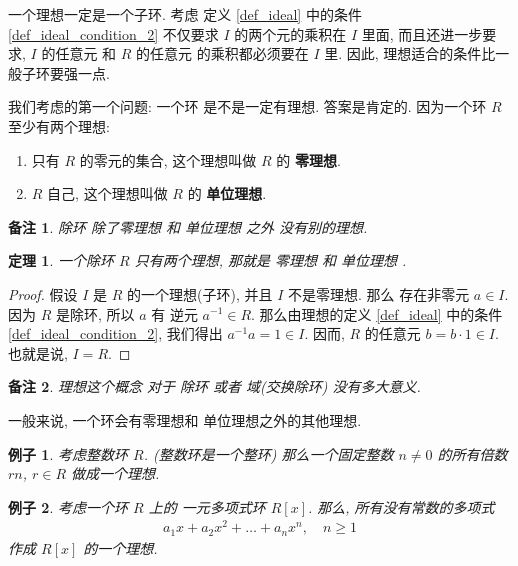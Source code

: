 \documentclass[utf8]{ctexbook}
\newtheorem{theorem}{定理}[section]
\newtheorem{memo}{备注}[section]
\newtheorem{example}{例子}[section]
\begin{document}
一个理想一定是一个子环. 考虑 定义 \ref{def_ideal} 中的条件 \ref{def_ideal_condition_2} 不仅要求 $I$ 的两个元的乘积在 $I$ 里面, 而且还进一步要求, $I$ 的任意元 和 $R$ 的任意元 的乘积都必须要在 $I$ 里. 因此, 理想适合的条件比一般子环要强一点.

我们考虑的第一个问题: 一个环 是不是一定有理想. 答案是肯定的. 因为一个环 $R$ 至少有两个理想:
\begin{enumerate}
\item{只有 $R$ 的零元的集合, 这个理想叫做 $R$ 的 \textbf{零理想}.}
\item{$R$ 自己, 这个理想叫做 $R$ 的 \textbf{单位理想}.}
\end{enumerate}

\begin{memo}
除环 除了零理想 和 单位理想 之外 没有别的理想.
\end{memo}

\begin{theorem}
一个除环 $R$ 只有两个理想, 那就是 零理想 和 单位理想 .
\end{theorem}

\begin{proof}
假设 $I$ 是 $R$ 的一个理想(子环), 并且 $I$ 不是零理想. 那么 存在非零元 $a \in I$. 因为 $R$ 是除环, 所以 $a$ 有 逆元 $a^{-1} \in R $. 那么由理想的定义 \ref{def_ideal} 中的条件 \ref{def_ideal_condition_2}, 我们得出  $a^{-1} a = 1 \in I $. 因而, $R$ 的任意元  $b= b \cdot 1 \in I$. 也就是说, $I=R$.
\end{proof}

\begin{memo}
理想这个概念 对于 除环 或者 域(交换除环) 没有多大意义. 
\end{memo}

一般来说, 一个环会有零理想和 单位理想之外的其他理想.

\begin{example}\label{example_principle_ideal_generated_by_n}
考虑整数环 $R$. (整数环是一个整环) 那么一个固定整数 $n \neq 0 $ 的所有倍数 $rn$, $r \in R$ 做成一个理想.
\end{example}

\begin{example}
考虑一个环 $R$ 上的 一元多项式环 $R[x]$. 那么, 所有没有常数的多项式
\begin{align*}
a_1 x + a_2 x^2 + \ldots + a_n x^n, \quad n \geq 1
\end{align*}
作成 $R[x]$ 的一个理想.
\end{example}
\end{document}
